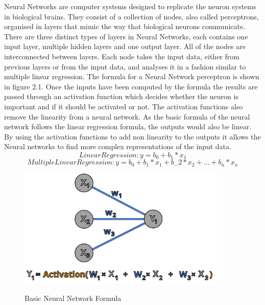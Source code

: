 \documentclass{imc-inf}
\begin{document}
 	Neural Networks are computer systems designed to replicate the neuron systems in biological brains. They consist of a collection of nodes, also called perceptrons, organised in layers that mimic the way that biological neurons communicate. 
 	There are three distinct types of layers in Neural Networks, each contains one input layer, multiple hidden layers and one output layer. All of the nodes are interconnected between layers. Each node takes the input data, either from previous layers or from the input data, and analyses it in a fashion similar to multiple linear regression. The formula for a Neural Network perceptron is shown in figure 2.1. Once the inputs have been computed by the formula the results are passed through an activation function which decides whether the neuron is important and if it should be activated or not. The activation functions also remove the linearity from a neural network. As the basic formula of the neural network follows the linear regression formula, the outputs would also be linear. By using the activation functions to add non linearity to the outputs it allows the Neural networks to find more complex representations of the input data. 
 	\begin{equation}
 		Linear Regression: y = b_{0} + b_{1}*x_{1}
 	\end{equation}
		\begin{equation}
		Multiple Linear Regression: y = b_{0} + b_{1}*x_{1} + b_-{2}*x_{2} + ... + b_{n}*x_{n}
	\end{equation}
	\begin{figure}
		\caption{Basic Neural Network Formula}
		\includegraphics[width=10cm]{media/nn_formula.png}
		\cite{website:BH_AI}
	\end{figure}
	\newline
	
\end{document}
